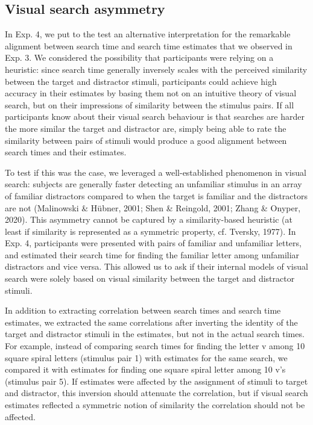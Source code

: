 \documentclass[12pt,twoside]{reedthesis}
\begin{document}
\hypertarget{asymmetry}{%
\subsection*{Visual search asymmetry}\label{asymmetry}}

In Exp. 4, we put to the test an alternative interpretation for the remarkable alignment between search time and search time estimates that we observed in Exp. 3. We considered the possibility that participants were relying on a heuristic: since search time generally inversely scales with the perceived similarity between the target and distractor stimuli, participants could achieve high accuracy in their estimates by basing them not on an intuitive theory of visual search, but on their impressions of similarity between the stimulus pairs. If all participants know about their visual search behaviour is that searches are harder the more similar the target and distractor are, simply being able to rate the similarity between pairs of stimuli would produce a good alignment between search times and their estimates.

To test if this was the case, we leveraged a well-established phenomenon in visual search: subjects are generally faster detecting an unfamiliar stimulus in an array of familiar distractors compared to when the target is familiar and the distractors are not (Malinowski \& Hübner, 2001; Shen \& Reingold, 2001; Zhang \& Onyper, 2020). This asymmetry cannot be captured by a similarity-based heuristic (at least if similarity is represented as a symmetric property, cf. Tversky, 1977). In Exp. 4, participants were presented with pairs of familiar and unfamiliar letters, and estimated their search time for finding the familiar letter among unfamiliar distractors and vice versa. This allowed us to ask if their internal models of visual search were solely based on visual similarity between the target and distractor stimuli.

In addition to extracting correlation between search times and search time estimates, we extracted the same correlations after inverting the identity of the target and distractor stimuli in the estimates, but not in the actual search times. For example, instead of comparing search times for finding the letter v among 10 square spiral letters (stimulus pair 1) with estimates for the same search, we compared it with estimates for finding one square spiral letter among 10 v's (stimulus pair 5). If estimates were affected by the assignment of stimuli to target and distractor, this inversion should attenuate the correlation, but if visual search estimates reflected a symmetric notion of similarity the correlation should not be affected.
\end{document}
